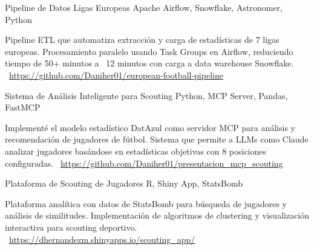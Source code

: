 \documentclass[]{awesome-cv}
\begin{document}
\begin{cventries}
	\vspace{-3mm}
	\cventry
	{}
	{Pipeline de Datos Ligas Europeas \vspace{-5mm}}
	{Apache Airflow, Snowflake, Astronomer, Python \vspace{-5mm}}
	{}
	{\begin{cvsectionnormaltext}
		\item {Pipeline ETL que automatiza extracción y carga de estadísticas de 7 ligas europeas. Procesamiento paralelo usando Task Groups en Airflow, reduciendo tiempo de 50+ minutos a ~12 minutos con carga a data warehouse Snowflake.
		\newline \faLink\ \href{https://github.com/Daniher01/european-football-pipeline}{https://github.com/Daniher01/european-football-pipeline}}
	\end{cvsectionnormaltext}}

	\vspace{-3mm}
	\cventry
	{}
	{Sistema de Análisis Inteligente para Scouting \vspace{-5mm}}
	{Python, MCP Server, Pandas, FastMCP \vspace{-5mm}}
	{}
	{\begin{cvsectionnormaltext}
		\item {Implementé el modelo estadístico DatAzul como servidor MCP para análisis y recomendación de jugadores de fútbol. Sistema que permite a LLMs como Claude analizar jugadores basándose en estadísticas objetivas con 8 posiciones configuradas.
		\newline \faLink\ \href{https://github.com/Daniher01/presentacion_mcp_scouting}{https://github.com/Daniher01/presentacion\_mcp\_scouting}}
	\end{cvsectionnormaltext}}

	\vspace{-3mm}
	\cventry
	{}
	{Plataforma de Scouting de Jugadores \vspace{-5mm}}
	{R, Shiny App, StatsBomb \vspace{-5mm}}
	{}
	{\begin{cvsectionnormaltext}
		\item {Plataforma analítica con datos de StatsBomb para búsqueda de jugadores y análisis de similitudes. Implementación de algoritmos de clustering y visualización interactiva para scouting deportivo.
		\newline \faLink\ \href{https://dhernandezm.shinyapps.io/scouting_app/}{https://dhernandezm.shinyapps.io/scouting\_app/}}
	\end{cvsectionnormaltext}}


\end{cventries}
\end{document}
